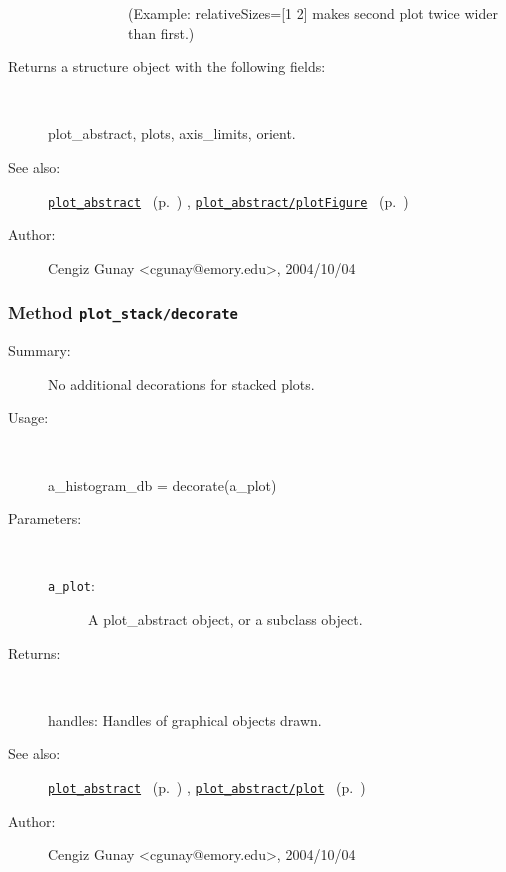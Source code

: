 \begin{description}
\begin{description}
\begin{description}
(Example: relativeSizes=[1 2] makes second plot twice wider than first.)
\end{description}%
\end{description}%
%
\item[Returns a structure object with the following fields:
]~

	plot\_abstract, plots, axis\_limits, orient.
%
%
\item[See also:]%
\hyperlink{ref_plot_abstract}{\texttt{plot\_abstract}}%
\ (p.~\pageref{ref_plot_abstract})%
%
, \hyperlink{ref_plot_abstract__plotFigure}{\texttt{plot\_abstract/plotFigure}}%
\ (p.~\pageref{ref_plot_abstract__plotFigure})%
%
%
\item[Author:]%
Cengiz Gunay <cgunay@emory.edu>, 2004/10/04
%
\end{description}
\methodline%
\subsubsection[Method \texttt{decorate}]{Method \texttt{plot\_stack/decorate}}%
%
\label{ref_plot_stack__decorate}%
\hypertarget{ref_plot_stack__decorate}{}%
\begin{description}
\item[Summary:]No additional decorations for stacked plots.
%
\item[Usage:]~%
\begin{lyxcode}%
a\_histogram\_db = decorate(a\_plot)
%
\end{lyxcode}%
%
%
\item[Parameters:]~
\begin{description}%
\item[\texttt{a\_plot}:]
 A plot\_abstract object, or a subclass object.
\end{description}%
%
\item[Returns:
]~

	handles: Handles of graphical objects drawn.
%
%
\item[See also:]%
\hyperlink{ref_plot_abstract}{\texttt{plot\_abstract}}%
\ (p.~\pageref{ref_plot_abstract})%
%
, \hyperlink{ref_plot_abstract__plot}{\texttt{plot\_abstract/plot}}%
\ (p.~\pageref{ref_plot_abstract__plot})%
%
%
\item[Author:]%
Cengiz Gunay <cgunay@emory.edu>, 2004/10/04
%
\end{description}
\methodline%
